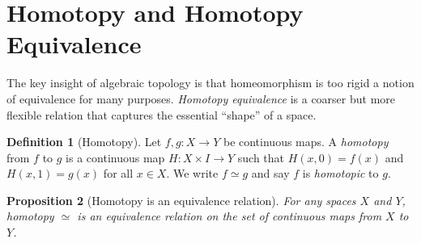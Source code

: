 \documentclass[12pt,a4paper,openany]{book}
\theoremstyle{definition}
\newtheorem{definition}{Definition}[chapter]
\theoremstyle{plain}
\newtheorem{proposition}[definition]{Proposition}
\theoremstyle{remark}
\begin{document}
\section{Homotopy and Homotopy Equivalence}\label{sec:homotopy}

The key insight of algebraic topology is that homeomorphism is too rigid a
notion of equivalence for many purposes. \emph{Homotopy equivalence} is a
coarser but more flexible relation that captures the essential ``shape'' of a
space.

\begin{definition}[Homotopy]\label{def:homotopy}
Let $f, g \colon X \to Y$ be continuous maps. A \emph{homotopy}
from $f$ to $g$ is a continuous map $H \colon X \times I \to Y$ such that
$H(x, 0) = f(x)$ and $H(x, 1) = g(x)$ for all $x \in X$. We write $f
\simeq g$ and say $f$ is \emph{homotopic} to $g$.
\end{definition}

\begin{center}
\label{fig:homotopy}
\end{center}

\begin{proposition}[Homotopy is an equivalence relation]\label{prop:homotopy-equiv-rel}
For any spaces $X$ and $Y$, homotopy $\simeq$ is an equivalence relation on the
set of continuous maps from $X$ to $Y$.
\end{proposition}
\end{document}
